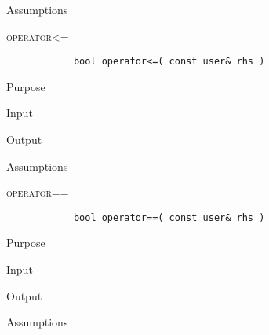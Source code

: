 \documentclass[pdftex, 12pt]{article}
\begin{document}
\begin{description}
\begin{description}
			\item{Assumptions}

		\end{description}
	\item{\textsc{operator<=}}
		\begin{lstlisting}
			bool operator<=( const user& rhs )
		\end{lstlisting}
		\begin{description}

			\item{Purpose}

			\item{Input}

			\item{Output}

			\item{Assumptions}

		\end{description}
	\item{\textsc{operator==}}
		\begin{lstlisting}
			bool operator==( const user& rhs )
		\end{lstlisting}
		\begin{description}

			\item{Purpose}

			\item{Input}

			\item{Output}

			\item{Assumptions}

		\end{description}

\end{description}
\end{document}
